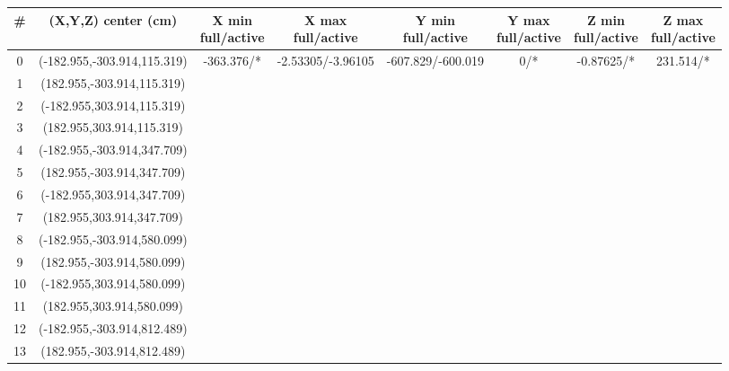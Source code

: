\documentclass[8pt]{refart}
\begin{document}

{
    \centering
    \begin{tabular}{|c|c|c|c|c|c|c|c|}
        \hline
        \# & (X,Y,Z) center (cm) & \makecell{X min\\full/{\color{red}active}} & \makecell{X max\\full/{\color{red}active}} & \makecell{Y min\\full/{\color{red}active}} & \makecell{Y max\\full/{\color{red}active}} & \makecell{Z min\\full/{\color{red}active}} & \makecell{Z max\\full/{\color{red}active}} \\
        \hline
        \hline
         0 &  (-182.955,-303.914,115.319) & -363.376/{\color{red}*} & -2.53305/{\color{red}-3.96105} & -607.829/{\color{red}-600.019} & 0/{\color{red}*} & -0.87625/{\color{red}*} & 231.514/{\color{red}*}\\
         \hline
         1 &(182.955,-303.914,115.319)& & & & & &  \\
         \hline
         2 &(-182.955,303.914,115.319)& & & & & &  \\
         \hline
         3 &(182.955,303.914,115.319)& & & & & &  \\
         \hline
         4 &(-182.955,-303.914,347.709)& & & & & &  \\
         \hline
         5 &(182.955,-303.914,347.709)& & & & & &  \\
         \hline
         6 &(-182.955,303.914,347.709)& & & & & &  \\
         \hline
         7 &(182.955,303.914,347.709)& & & & & &  \\
         \hline
         8 &(-182.955,-303.914,580.099)& & & & & &  \\
         \hline
         9 &(182.955,-303.914,580.099)& & & & & &  \\
         \hline
         10 &(-182.955,303.914,580.099)& & & & & &  \\
         \hline
         11 &(182.955,303.914,580.099)& & & & & &  \\
         \hline
         12 &(-182.955,-303.914,812.489)& & & & & &  \\
         \hline
         13 &(182.955,-303.914,812.489)& & & & & &  \\

\end{tabular}}
\end{document}
